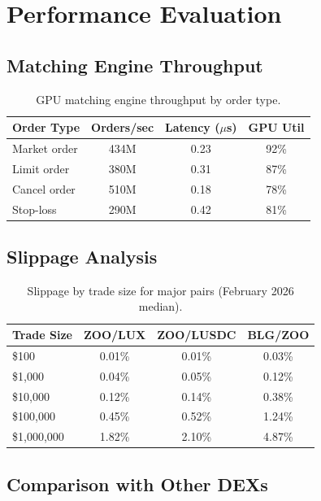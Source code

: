 \section{Performance Evaluation}

\label{sec:performance}

\subsection{Matching Engine Throughput}

\begin{table}[t]
\centering
\begin{tabular}{lccc}
\toprule
\textbf{Order Type} & \textbf{Orders/sec} & \textbf{Latency ($\mu$s)} & \textbf{GPU Util} \\
\midrule
Market order & 434M & 0.23 & 92\% \\
Limit order & 380M & 0.31 & 87\% \\
Cancel order & 510M & 0.18 & 78\% \\
Stop-loss & 290M & 0.42 & 81\% \\
\bottomrule
\end{tabular}
\caption{GPU matching engine throughput by order type.}
\label{tab:matching}
\end{table}

\subsection{Slippage Analysis}

\begin{table}[t]
\centering
\begin{tabular}{lccc}
\toprule
\textbf{Trade Size} & \textbf{ZOO/LUX} & \textbf{ZOO/LUSDC} & \textbf{BLG/ZOO} \\
\midrule
\$100 & 0.01\% & 0.01\% & 0.03\% \\
\$1,000 & 0.04\% & 0.05\% & 0.12\% \\
\$10,000 & 0.12\% & 0.14\% & 0.38\% \\
\$100,000 & 0.45\% & 0.52\% & 1.24\% \\
\$1,000,000 & 1.82\% & 2.10\% & 4.87\% \\
\bottomrule
\end{tabular}
\caption{Slippage by trade size for major pairs (February 2026 median).}
\label{tab:slippage}
\end{table}

\subsection{Comparison with Other DEXs}

